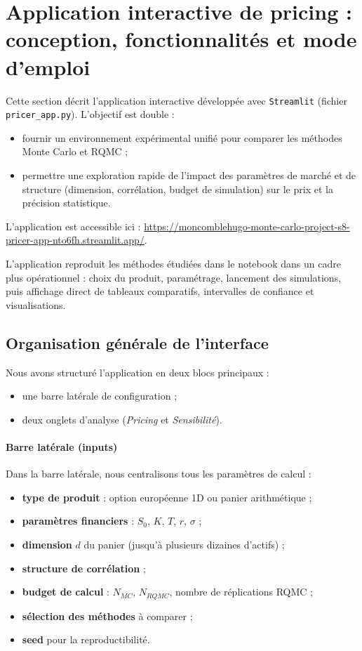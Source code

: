 ﻿\documentclass[11pt,a4paper]{article}
\begin{document}
\section{Application interactive de pricing : conception, fonctionnalités et mode d'emploi}

Cette section décrit l'application interactive développée avec \texttt{Streamlit} (fichier \texttt{pricer\_app.py}). L'objectif est double :
\begin{itemize}
    \item fournir un environnement expérimental unifié pour comparer les méthodes Monte Carlo et RQMC ;
    \item permettre une exploration rapide de l'impact des paramètres de marché et de structure (dimension, corrélation, budget de simulation) sur le prix et la précision statistique.
\end{itemize}

L'application est accessible ici :
\href{https://moncomblehugo-monte-carlo-project-s8-pricer-app-nto6fh.streamlit.app/}{https://moncomblehugo-monte-carlo-project-s8-pricer-app-nto6fh.streamlit.app/}.

L'application reproduit les méthodes étudiées dans le notebook dans un cadre plus opérationnel : choix du produit, paramétrage, lancement des simulations, puis affichage direct de tableaux comparatifs, intervalles de confiance et visualisations.

\subsection{Organisation générale de l'interface}

Nous avons structuré l'application en deux blocs principaux :
\begin{itemize}
    \item une barre latérale de configuration ;
    \item deux onglets d'analyse (\textit{Pricing} et \textit{Sensibilité}).
\end{itemize}

\paragraph{Barre latérale (inputs)}
Dans la barre latérale, nous centralisons tous les paramètres de calcul :
\begin{itemize}
    \item \textbf{type de produit} : option européenne 1D ou panier arithmétique ;
    \item \textbf{paramètres financiers} : $S_0$, $K$, $T$, $r$, $\sigma$ ;
    \item \textbf{dimension} $d$ du panier (jusqu'à plusieurs dizaines d'actifs) ;
    \item \textbf{structure de corrélation} ;
    \item \textbf{budget de calcul} : $N_{MC}$, $N_{RQMC}$, nombre de réplications RQMC ;
    \item \textbf{sélection des méthodes} à comparer ;
    \item \textbf{seed} pour la reproductibilité.
\end{itemize}
\end{document}
